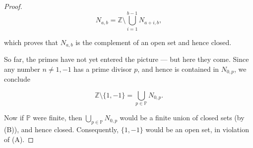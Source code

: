 \begin{proof}
    \[
    N_{a,b} = \mathbb{Z} \setminus \bigcup_{i=1}^{b-1} N_{a+i,b},
    \]

    which proves that \(N_{a,b}\) is the complement of an open set and hence closed.

    So far, the primes have not yet entered the picture — but here they come.
    Since any number \(n \neq 1, -1\) has a prime divisor \(p\), and hence is contained in \(N_{0,p}\), we conclude

    \[
    \mathbb{Z} \setminus \{1, -1\} = \bigcup_{p \in \mathbb{P}} N_{0,p}.
    \]

    Now if \(\mathbb{P}\) were finite, then \(\bigcup_{p \in \mathbb{P}} N_{0,p}\) would be a finite union of closed sets (by (B)), and hence closed.
    Consequently, \(\{1, -1\}\) would be an open set, in violation of (A).
\end{proof}

